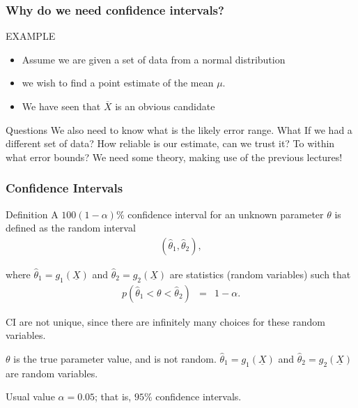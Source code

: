 \documentclass[xcolor=dvipsnames]{beamer}
\begin{document}
\begin{frame}
\frametitle{Why do we need confidence intervals?}
EXAMPLE
\begin{itemize}
\item Assume we are given a set of data from a normal distribution
 \item we  wish to find a point estimate of the mean $\mu.$ 
 \item We have seen that  $\overline{X}$ is an obvious candidate 
 \end{itemize}
 \begin{alertblock}{Questions}
 We also need to know what is the likely error range.
What If we had a different set of data?
How reliable is our estimate, can we trust it? 
To within what error
bounds? 
We need some theory, making use of the previous lectures!
\end{alertblock}
\end{frame}

\begin{frame}
\frametitle{Confidence Intervals}
\begin{alertblock}{Definition}
A $100(1-\alpha)\%$ confidence interval for an unknown parameter $\theta$ is defined as the random interval
\begin{eqnarray*}
({\hat \theta}_1,{\hat \theta}_2),
\end{eqnarray*}
\par\noindent where ${\hat \theta}_1=g_1({\underline X})$ and ${\hat \theta}_2=g_2({\underline X})$ are statistics (random variables) such that
\begin{eqnarray*}
p({\hat \theta}_1 < \theta < {\hat \theta}_2) &=& 1-\alpha.
\end{eqnarray*}
\end{alertblock}

\par{} CI are not unique, since there are infinitely many choices for these random variables.\\
\par{} $\theta$ is the true parameter value, and is not random. ${\hat \theta}_1=g_1({\underline X})$ and ${\hat \theta}_2=g_2({\underline X})$ are random variables.\\
\par{} Usual value $\alpha=0.05$; that is, $95\%$ confidence intervals.

\end{frame}
\end{document}
